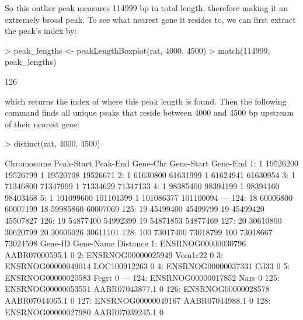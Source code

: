 \documentclass[12pt]{article}
\begin{document}
So this outlier peak measures 114999 bp in total length, therefore making it an extremely broad peak.  To see what nearest gene it resides to, we can first extract the peak's index by:

\begin{Schunk}
\begin{Sinput}
> peak_lengths <- peakLengthBoxplot(rat, 4000, 4500)
> match(114999, peak_lengths)
\end{Sinput}
\begin{Soutput}
[1] 126
\end{Soutput}
\end{Schunk}

which returns the index of where this peak length is found.  Then the following command finds all unique peaks that reside between 4000 and 4500 bp upstream of their nearest gene:

\begin{Schunk}
\begin{Sinput}
> distinct(rat, 4000, 4500)
\end{Sinput}
\begin{Soutput}
     Chromosome Peak-Start  Peak-End Gene-Chr Gene-Start  Gene-End
  1:          1   19526200  19526799        1   19520708  19526671
  2:          1   61630800  61631999        1   61624941  61630954
  3:          1   71346800  71347999        1   71334629  71347133
  4:          1   98385400  98394199        1   98394160  98403468
  5:          1  101099600 101101399        1  101086377 101100094
 ---                                                              
124:         18   60006800  60007199       18   59985860  60007069
125:         19   45499400  45499799       19   45499420  45507827
126:         19   54877400  54992399       19   54871853  54877469
127:         20   30610800  30620799       20   30606026  30611101
128:        100   73017400  73018799      100   73018667  73024598
                Gene-ID      Gene-Name Distance
  1: ENSRNOG00000030796 AABR07000595.1        0
  2: ENSRNOG00000025949        Vom1r22        0
  3: ENSRNOG00000049014   LOC100912263        0
  4: ENSRNOG00000037331           Cd33        0
  5: ENSRNOG00000020583          Fcgrt        0
 ---                                           
124: ENSRNOG00000017852           Nars        0
125: ENSRNOG00000053551 AABR07043877.1        0
126: ENSRNOG00000028578 AABR07044065.1        0
127: ENSRNOG00000049167 AABR07044988.1        0
128: ENSRNOG00000027980 AABR07039245.1        0
\end{Soutput}
\end{Schunk}
\end{document}
